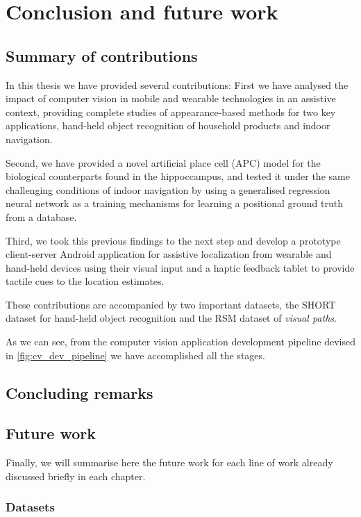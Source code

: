 \chapter{Conclusion and future work}\label{ch:conclusion}

\section{Summary of contributions}

In this thesis we have provided several contributions: First we have analysed the impact of computer vision in mobile and wearable technologies in an assistive context, providing complete studies of appearance-based methods for two key applications, hand-held object recognition of household products and indoor navigation.

Second, we have provided a novel artificial place cell (APC) model for the biological counterparts found in the hippoccampus, and tested it under the same challenging conditions of indoor navigation by using a generalised regression neural network as a training mechanisms for learning a positional ground truth from a database.

Third, we took this previous findings to the next step and develop a prototype client-server Android application for assistive localization from wearable and hand-held devices using their visual input and a haptic feedback tablet to provide tactile cues to the location estimates.

These contributions are accompanied by two important datasets, the SHORT dataset for hand-held object recognition and the RSM dataset of \emph{visual paths}.

As we can see, from the computer vision application development pipeline devised in \ref{fig:cv_dev_pipeline} we have accomplished all the stages.

\section{Concluding remarks}

\section{Future work}

Finally, we will summarise here the future work for each line of work already discussed briefly in each chapter.

\subsection{Datasets}

